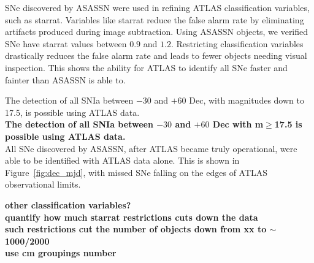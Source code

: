 \documentclass[aps,prb,twocolumn,superscriptaddress]{revtex4-1}
\begin{document}
\indent SNe discovered by ASASSN were used in refining ATLAS classification 
variables, such as starrat.  Variables like starrat reduce the 
false alarm rate by eliminating artifacts produced during image 
subtraction.  Using ASASSN objects, we verified SNe have starrat values 
between $0.9$ and $1.2$.  
Restricting classification variables drastically reduces the false alarm rate and leads 
to fewer objects needing visual inspection. This shows the ability 
for ATLAS to identify all SNe faster and fainter than ASASSN is able to.

\indent The detection of all SNIa between $-30$ and $+60$ Dec, with 
magnitudes down to 17.5, is possible using ATLAS data.  \\
{\bf The detection of all SNIa between $-30$ and 
$+60$ Dec with m$\geq$17.5 is possible using ATLAS data.  \\}
All SNe discovered by ASASSN, after ATLAS became truly operational, were 
able to be identified with ATLAS data alone.  This is shown in 
Figure~\ref{fig:dec_mjd}, with missed SNe falling on the edges of ATLAS 
observational limits.


{\bf \noindent other classification variables?}\\
{\bf \noindent quantify how much starrat restrictions cuts down the data\\
\indent such restrictions cut the number of objects down from xx to $\sim$1000/2000\\
\indent use cm groupings number
}

\end{document}

